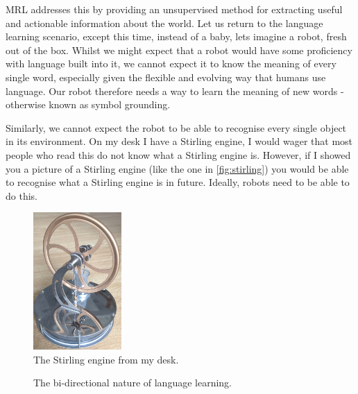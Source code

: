 \ac{MRL} addresses this by providing an unsupervised method for extracting useful and actionable information about the world. Let us return to the language learning scenario, except this time, instead of a baby, lets imagine a robot, fresh out of the box. Whilst we might expect that a robot would have some proficiency with language built into it, we cannot expect it to know the meaning of every single word, especially given the flexible and evolving way that humans use language. Our robot therefore needs a way to learn the meaning of new words - otherwise known as symbol grounding. 

Similarly, we cannot expect the robot to be able to recognise every single object in its environment. On my desk I have a Stirling engine, I would wager that most people who read this do not know what a Stirling engine is. However, if I showed you a picture of a Stirling engine (like the one in \autoref{fig:stirling}) you would be able to recognise what a Stirling engine is in future. Ideally, robots need to be able to do this.

\begin{figure}
\centering
	\includegraphics[width=0.3\textwidth]{Figs/introduction/stirling.jpg}
	\caption{The Stirling engine from my desk.}
	\label{fig:stirling}
\end{figure}

\begin{figure}
\centering
{}
\caption{The bi-directional nature of language learning.}
\label{fig:bi_ll}
\end{figure}

